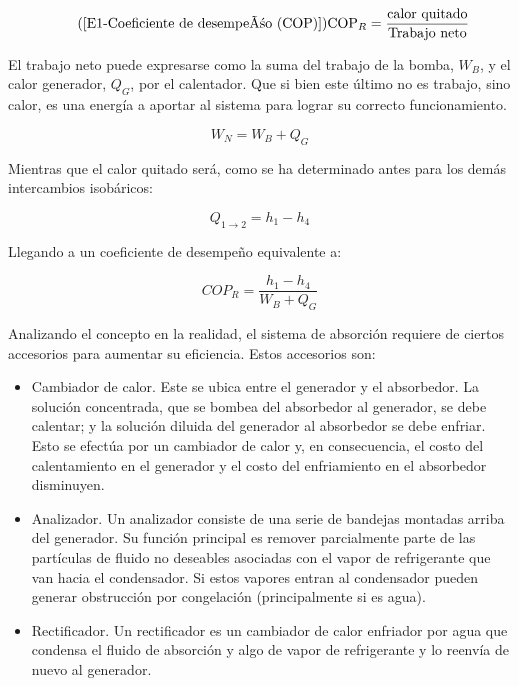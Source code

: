 	\begin{equation}\tag{\ref{E1-Coeficiente de desempeño (COP)}}
		\text{COP}_R = \dfrac{\text{calor quitado}}{\text{Trabajo neto}}
	\end{equation}

	El trabajo neto puede expresarse como la suma del trabajo de la bomba, $W_B$, y el calor generador, $Q_G$, por el calentador. Que si bien este último no es trabajo, sino calor, es una energía a aportar al sistema para lograr su correcto funcionamiento.

	\begin{equation}\nonumber
		W_N = W_B + Q_G
	\end{equation}

	Mientras que el calor quitado será, como se ha determinado antes para los demás intercambios isobáricos:

	\begin{equation}\nonumber
		Q_{1\rightarrow 2} = h_1 - h_4
	\end{equation}

	Llegando a un coeficiente de desempeño equivalente a:

	\begin{equation}\label{E1-COP para un ciclo de absorción}
		COP_R = \dfrac{h_1 - h_4}{W_B + Q_G}
	\end{equation}

	Analizando el concepto en la realidad, el sistema de absorción requiere de ciertos accesorios para aumentar su eficiencia. Estos accesorios son:

	\begin{itemize}
		\item Cambiador de calor. Este se ubica entre el generador y el absorbedor. La solución concentrada, que se bombea del absorbedor al generador, se debe calentar; y la solución diluida del generador al absorbedor se debe enfriar. Esto se efectúa por un cambiador de calor y, en consecuencia, el costo del calentamiento en el generador y el costo del enfriamiento en el absorbedor disminuyen.
		\item Analizador. Un analizador consiste de una serie de bandejas montadas arriba del generador. Su función principal es remover parcialmente parte de las partículas de fluido no deseables asociadas con el vapor de refrigerante que van hacia el condensador. Si estos vapores entran al condensador pueden generar obstrucción por congelación (principalmente si es agua).
		\item Rectificador. Un rectificador es un cambiador de calor enfriador por agua que condensa el fluido de absorción y algo de vapor de refrigerante y lo reenvía de nuevo al generador.
	\end{itemize}

